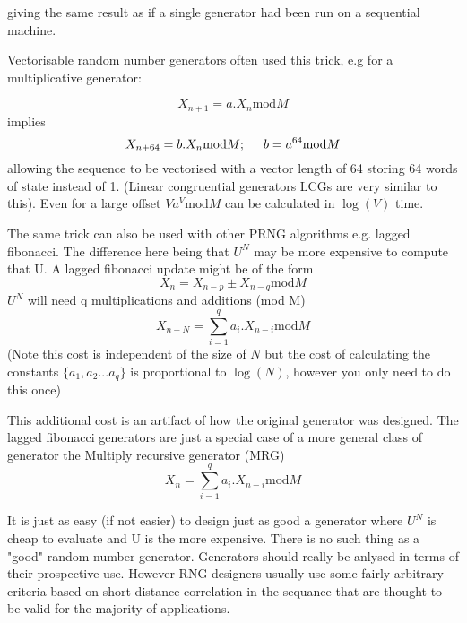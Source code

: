 \documentclass[12pt]{article}
\begin{document}
giving the same result as if a single generator had been run on a
sequential machine.

Vectorisable random number generators often used this trick, e.g for a
multiplicative  generator:

\begin{equation}
  X_{n+1}     = a . X_n  \mbox{mod} M
\end{equation}
implies
\begin{equation}
  X_{n+64}     = b . X_n \mbox{mod} M;  \hspace{5mm}  b = a^{64} \mbox{mod} M
\end{equation}
allowing the sequence to be vectorised with a vector length of 64
storing 64 words of state instead of 1.
(Linear congruential generators LCGs are very similar to this).
Even for a large offset $V a^V \mbox{mod} M$ can be calculated in $\log(V)$ time.


The same trick can also be used with other PRNG algorithms e.g. lagged
fibonacci. The difference here being that $U^N$ may be more expensive to
compute that U.  A lagged fibonacci update might be of the form
\begin{equation}
    X_n   =  X_{n-p} \pm  X_{n-q} \mbox{mod} M
\end{equation}
$U^N$ will need q multiplications and additions (mod M)
\begin{equation}
X_{n+N}= \sum_{i=1}^{q}    a_i .X_{n-i}  \mbox{mod} M
\end{equation}
(Note this cost is independent of the size of $N$ but the cost of
 calculating the constants $\{a_1, a_2 ... a_q\}$ is proportional to
 $\log(N)$, however you only need to do this once)

This additional cost is an artifact of how the original generator was
designed. The lagged fibonacci generators are just a special case of a
more general class of generator the Multiply recursive generator (MRG)
\begin{equation}
X_n  = \sum_{i=1}^q   a_i .X_{n-i} \mbox{mod} M
\end{equation}

It is just as easy (if not easier) to design just as good a
generator where $U^N$ is cheap to evaluate and U is the more expensive.
There is no such thing as a "good" random number generator. Generators
should really be anlysed in terms of their prospective use. However 
RNG designers usually use some fairly arbitrary criteria based on
short distance correlation in the sequance that are
thought to be valid for the majority of applications.
\end{document}

